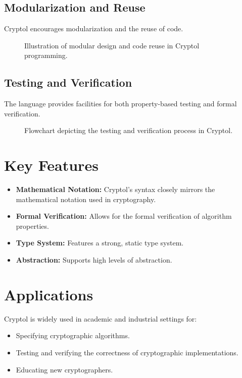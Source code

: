 \documentclass[12pt]{article}
\begin{document}
	\subsection*{Modularization and Reuse}
	Cryptol encourages modularization and the reuse of code.
	
	\begin{figure}[ht]
		\centering
		\caption{Illustration of modular design and code reuse in Cryptol programming.}
		\label{fig:modularization}
	\end{figure}
	
	\subsection*{Testing and Verification}
	The language provides facilities for both property-based testing and formal verification.
	
	\begin{figure}[ht]
		\centering
		\caption{Flowchart depicting the testing and verification process in Cryptol.}
		\label{fig:testing_verification}
	\end{figure}
	
	\section*{Key Features}
	\begin{itemize}
		\item \textbf{Mathematical Notation:} Cryptol's syntax closely mirrors the mathematical notation used in cryptography.
		\item \textbf{Formal Verification:} Allows for the formal verification of algorithm properties.
		\item \textbf{Type System:} Features a strong, static type system.
		\item \textbf{Abstraction:} Supports high levels of abstraction.
	\end{itemize}
	
	\section*{Applications}
	Cryptol is widely used in academic and industrial settings for:
	\begin{itemize}
		\item Specifying cryptographic algorithms.
		\item Testing and verifying the correctness of cryptographic implementations.
		\item Educating new cryptographers.
	\end{itemize}
	
\end{document}
